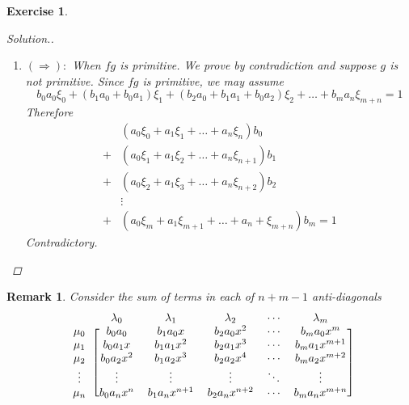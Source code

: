 \documentclass{article}
\theoremstyle{breakstyle}
\newtheorem{exercise}{Exercise}
\newtheorem{remark}{Remark}
\newenvironment{solution}
  {\begin{proof}[Solution.]\renewcommand{\qedsymbol}{}}
  {\end{proof}}
\begin{document}
\begin{exercise}
\begin{solution}
\begin{enumerate}[label=({\roman*})]
\begin{enumerate}[label=({\alph*})]
$$\begin{array}{r@{\:}l@{\:}l@{\:}l@{\:}l}
                                                     &                             & \vdots
                        \end{array}
                        $$
                        So
                        $$
                        (\lambda_0\mu_0b_0a_0)+(\lambda_0\mu_1b_0a_1+\lambda_1\mu_0b_1a_0)+(\lambda_0\mu_2b_0a_2+\lambda_1\mu_1b_1a_1+\lambda_2\mu_0b_2a_0)+\ldots +(\lambda_{m}\mu_{n}b_{m}a_{n})=1
                        $$
                    \item $(\Rightarrow):$ When $fg$ is primitive.
                        We prove by contradiction and suppose $g$ is not primitive.
                        Since $fg$ is primitive, we may assume
                        $$
                        b_0a_0\xi_0+(b_1a_0+b_0a_1)\xi_1+(b_2a_0+b_1a_1+b_0a_2)\xi_2+\ldots +b_{m}a_{n}\xi_{m+n}=1
                        $$
                        Therefore
                        \begin{align*}
                            &(a_0\xi_0+a_1\xi_1+\ldots +a_{n}\xi_{n})b_0\\
                            +&(a_0\xi_1+a_1\xi_2+\ldots +a_{n}\xi_{n+1})b_{1}\\
                            +&(a_0\xi_2+a_1\xi_3+\ldots +a_{n}\xi_{n+2})b_{2}\\
                            &\vdots\\
                            +&(a_0\xi_{m}+a_1\xi_{m+1}+\ldots +a_{n}+\xi_{m+n})b_{m}=1
                        \end{align*}
                        Contradictory.
                \end{enumerate}

        \end{enumerate}
\end{solution}
\end{exercise}

\begin{remark}
Consider the sum of terms in each of $n+m-1$ anti-diagonals
$$
\begin{blockarray}{cccccc}
 & \lambda_0 & \lambda_1 & \lambda_2 & \cdots & \lambda_m \\
\begin{block}{c[ccccc]}
  \mu_0 & b_0 a_0 & b_1 a_0 x & b_2 a_0 x^2 & \cdots & b_m a_0 x^m \\
  \mu_1 & b_0 a_1 x & b_1 a_1 x^2 & b_2 a_1 x^3 & \cdots & b_m a_1 x^{m+1} \\
  \mu_2 & b_0 a_2 x^2 & b_1 a_2 x^3 & b_2 a_2 x^4 & \cdots & b_m a_2 x^{m+2} \\
  \vdots & \vdots & \vdots & \vdots & \ddots & \vdots \\
  \mu_n & b_0 a_n x^n & b_1 a_n x^{n+1} & b_2 a_n x^{n+2} & \cdots & b_m a_n x^{m+n} \\
\end{block}
\end{blockarray}
$$
\end{remark}
\end{document}
